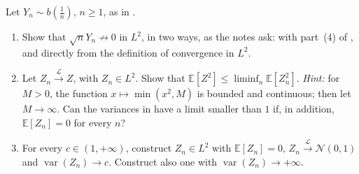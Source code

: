 \begin{exercise}\label{ex:ct-variances}
\medium Let $Y_n\sim b(\frac1n)$, $n\ge1$, as in .
\begin{enumerate}[label=(\alph*)]
  \item Show that $\sqrt nY_n\not\to0$ in $L^2$, in two ways, as the notes ask: with
    part~(4) of , and directly from the definition of convergence in $L^2$.
  \item Let $Z_n\xrightarrow{\mathcal L}Z$, with $Z_n\in L^2$. Show that
    $\mathbb E[Z^2]\le\liminf_n\mathbb E[Z_n^2]$. \emph{Hint:} for $M>0$, the function
    $x\mapsto\min(x^2,M)$ is bounded and continuous; then let $M\to\infty$. Can the variances in
     have a limit smaller than $1$ if, in addition,
    $\mathbb E[Z_n]=0$ for every $n$?
  \item For every $c\in(1,+\infty)$, construct $Z_n\in L^2$ with $\mathbb E[Z_n]=0$,
    $Z_n\xrightarrow{\mathcal L}\mathcal N(0,1)$ and $\operatorname{var}(Z_n)\to c$. Construct also
    one with $\operatorname{var}(Z_n)\to+\infty$.
\end{enumerate}
\end{exercise}

